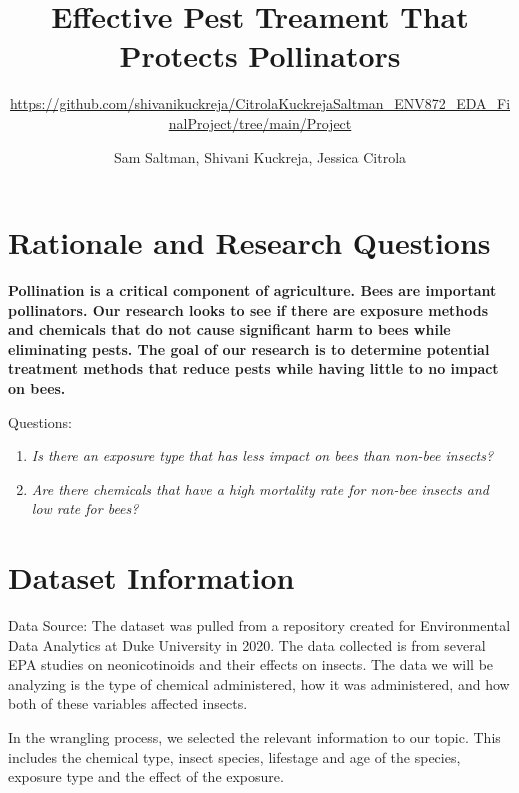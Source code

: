 \documentclass[
  12pt,
]{article}
\title{Effective Pest Treament That Protects Pollinators}
\subtitle{\url{https://github.com/shivanikuckreja/CitrolaKuckrejaSaltman_ENV872_EDA_FinalProject/tree/main/Project}}
\author{Sam Saltman, Shivani Kuckreja, Jessica Citrola}
\date{}
\begin{document}
\maketitle

\newpage
\tableofcontents 
\newpage
\listoftables 
\newpage
\listoffigures 
\newpage

\hypertarget{rationale-and-research-questions}{%
\section{Rationale and Research
Questions}\label{rationale-and-research-questions}}

\textbf{Pollination is a critical component of agriculture. Bees are
important pollinators. Our research looks to see if there are exposure
methods and chemicals that do not cause significant harm to bees while
eliminating pests. The goal of our research is to determine potential
treatment methods that reduce pests while having little to no impact on
bees.}

Questions:

\begin{enumerate}
\def\labelenumi{\arabic{enumi}.}
\item
  \emph{Is there an exposure type that has less impact on bees than
  non-bee insects?}
\item
  \emph{Are there chemicals that have a high mortality rate for non-bee
  insects and low rate for bees?}
\end{enumerate}

\newpage

\hypertarget{dataset-information}{%
\section{Dataset Information}\label{dataset-information}}

Data Source: The dataset was pulled from a repository created for
Environmental Data Analytics at Duke University in 2020. The data
collected is from several EPA studies on neonicotinoids and their
effects on insects. The data we will be analyzing is the type of
chemical administered, how it was administered, and how both of these
variables affected insects.

In the wrangling process, we selected the relevant information to our
topic. This includes the chemical type, insect species, lifestage and
age of the species, exposure type and the effect of the exposure.
\end{document}
